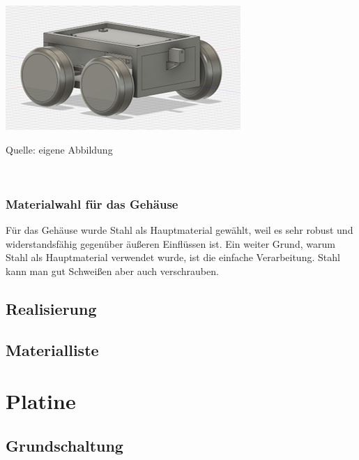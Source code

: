 \documentclass[ngerman,12pt,a4paper]{article}
\begin{document}
		\begin{center} 
			\begin{minipage}[t]{0.6\textwidth}
				\includegraphics{Pictures/modell-fertig}
				\label{fig:modell-fertig}
				\vspace{-10pt}
				\begin{center}
					\par\small Quelle: eigene Abbildung 
				\end{center}
			\end{minipage} \\[0.75cm]
		\end{center} 
	
		\subsubsection*{Materialwahl für das Gehäuse}
		Für das Gehäuse wurde Stahl als Hauptmaterial gewählt, weil es sehr robust und widerstandsfähig gegenüber äußeren Einflüssen ist. Ein weiter Grund, warum Stahl als Hauptmaterial verwendet wurde, ist die einfache Verarbeitung. Stahl kann man gut Schweißen aber auch verschrauben.
		
		\subsection{Realisierung} %
	
		\subsection{Materialliste} %
	\newpage
	\section{Platine}
	
		\subsection{Grundschaltung} %
		
\end{document}
